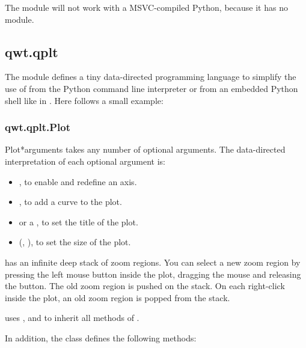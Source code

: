 \documentclass{manual}
\begin{document}
\begin{notice}[warning]
  The module  will not work with a MSVC-compiled Python, because
  it has no  module.
\end{notice}


\subsection{qwt.qplt \label{qwt-qplt}}

The module  defines a tiny data-directed programming
language to simplify the use of  from the Python command
line interpreter or from an embedded Python shell like in .
Here follows a small example:



\subsubsection{qwt.qplt.Plot \label{intro-qplt-plot}}

\begin{classdesc}{Plot}{*arguments}
   takes any number of optional arguments.
  The data-directed interpretation of each optional argument is:
  \begin{itemize}
  \item
    , to enable and redefine an axis.
  \item
    , to add a curve to the plot.
  \item
     or a , to set the title of the plot.
  \item
    (, ), to set the size of the plot.
  \end{itemize}

   has an infinite deep stack of zoom regions.
  You can select a new zoom region by pressing the left mouse button
  inside the plot, dragging the mouse and releasing the button.
  The old zoom region is pushed on the stack.
  On each right-click inside the plot, an old zoom region is
  popped from the stack.

   uses ,  and
   to inherit all methods of .
\end{classdesc}

In addition, the class  defines the following methods:
\end{document}
